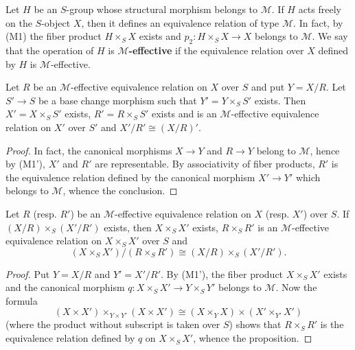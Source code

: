 \begin{example}
Let $H$ be an $S$-group whose structural morphism belongs to $\mathcal{M}$. If $H$ acts freely on the $S$-object $X$, then it defines an equivalence relation of type $\mathcal{M}$. In fact, by (M1) the fiber product $H\times_SX$ exists and $p_2:H\times_SX\to X$ belongs to $\mathcal{M}$. We say that the operation of $H$ is \textbf{$\mathcal{M}$-effective} if the equivalence relation over $X$ defined by $H$ is $\mathcal{M}$-effective.
\end{example}

\begin{proposition}\label{category equivalence relation M-effective and base change}
Let $R$ be an $\mathcal{M}$-effective equivalence relation on $X$ over $S$ and put $Y=X/R$. Let $S'\to S$ be a base change morphism such that $Y'=Y\times_SS'$ exists. Then $X'=X\times_SS'$ exists, $R'=R\times_SS'$ exists and is an $\mathcal{M}$-effective equivalence relation on $X'$ over $S'$ and $X'/R'\cong(X/R)'$.
\end{proposition}
\begin{proof}
In fact, the canonical morphisms $X\to Y$ and $R\to Y$ belong to $\mathcal{M}$, hence by (M1'), $X'$ and $R'$ are representable. By associativity of fiber products, $R'$ is the equivalence relation defined by the canonical morphism $X'\to Y'$ which belongs to $\mathcal{M}$, whence the conclusion.
\end{proof}

\begin{proposition}\label{category equivalence relation M-effective and product}
Let $R$ (resp. $R'$) be an $\mathcal{M}$-effective equivalence relation on $X$ (resp. $X'$) over $S$. If $(X/R)\times_S(X'/R')$ exists, then $X\times_SX'$ exists, $R\times_SR'$ is an $\mathcal{M}$-effective equivalence relation on $X\times_SX'$ over $S$ and
\[(X\times_SX')/(R\times_SR')\cong (X/R)\times_S(X'/R').\]
\end{proposition}
\begin{proof}
Put $Y=X/R$ and $Y'=X'/R'$. By (M1'), the fiber product $X\times_SX'$ exists and the canonical morphism $q:X\times_SX'\to Y\times_SY'$ belongs to $\mathcal{M}$. Now the formula
\[(X\times X')\times_{Y\times Y'}(X\times X')\cong (X\times_YX)\times(X'\times_{Y'}X')\]
(where the product without subscript is taken over $S$) shows that $R\times_SR'$ is the equivalence relation defined by $q$ on $X\times_SX'$, whence the proposition.
\end{proof}

